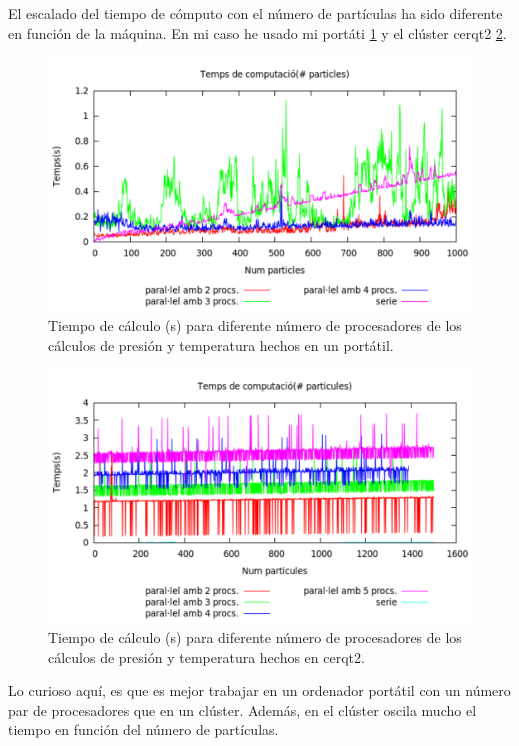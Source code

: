 El escalado del tiempo de cómputo con el número de partículas ha sido diferente en función de la máquina. En mi caso he usado mi portáti \ref{fig:workerii_ana} y el clúster cerqt2 \ref{fig:cerqt2_ana}.
\begin{figure}[h!]
\includegraphics[scale=0.50]{bench_ana_workerII.pdf} 
\caption{Tiempo de cálculo (s) para diferente número de procesadores de los cálculos de presión y temperatura hechos en un portátil.} 
\label{fig:workerii_ana}
\end{figure}
\begin{figure}[h!]
\includegraphics[scale=0.50]{bench_ana_cerqt2.pdf} 
\caption{Tiempo de cálculo (s) para diferente número de procesadores de los cálculos de presión y temperatura hechos en cerqt2.} 
\label{fig:cerqt2_ana}
\end{figure}
Lo curioso aquí, es que es mejor trabajar en un ordenador portátil con un número par de procesadores que en un clúster. Además, en el clúster oscila mucho el tiempo en función del número de partículas.

